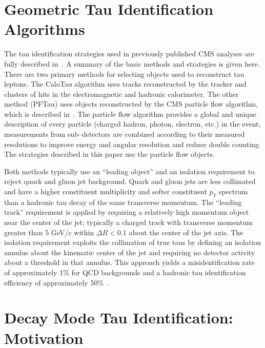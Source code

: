 \section{Geometric Tau Identification Algorithms}

The tau identification strategies used in previously published CMS analyses are
fully described in~\cite{CMS-PAS-PFT-08-001}.  A summary of the basic methods
and strategies is given here. There are two primary methods for selecting
objects used to reconstruct tau leptons.  The CaloTau algorithm uses tracks
reconstructed by the tracker and clusters of hits in the electromagnetic and
hadronic calorimeter.  The other method (PFTau) uses objects reconstructed by
the CMS particle flow algorithm, which is described
in~\cite{CMS-PAS-PFT-09-001}.  The particle flow algorithm provides a global and
unique description of every particle (charged hadron, photon, electron, etc.) in
the event; measurements from sub--detectors are combined according to their
measured resolutions to improve energy and angular resolution and reduce double
counting.  The strategies described in this paper use the particle flow objects.

Both methods typically use an ``leading object'' and an isolation requirement to
reject quark and gluon jet background.  Quark and gluon jets are less collimated
and have a higher constituent multiplicity and softer constituent $p_T$ spectrum
than a hadronic tau decay of the same transverse momentum.  The ``leading
track'' requirement is applied by requiring a relatively high momentum object
near the center of the jet; typically a charged track with transverse momentum
greater than 5 GeV/c within $\Delta R < 0.1$ about the center of the jet axis.
The isolation requirement exploits the collimation of true taus by defining an
isolation annulus about the kinematic center of the jet and requiring no
detector activity about a threshold in that annulus.  This approach yields a
misidentification rate of approximately 1\% for QCD backgrounds and a hadronic
tau identification efficiency of approximately 50\%~\cite{CMS-PAS-PFT-08-001}.

\section{Decay Mode Tau Identification: Motivation}

